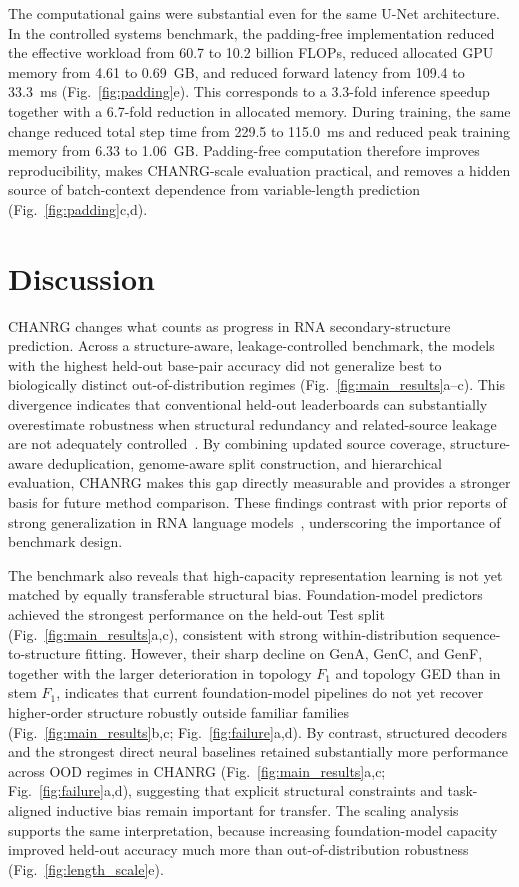 \documentclass[pdflatex,sn-mathphys-num]{sn-jnl}%
\theoremstyle{thmstyleone}%
\theoremstyle{thmstyletwo}%
\theoremstyle{thmstylethree}%
\begin{document}
The computational gains were substantial even for the same U-Net architecture.
In the controlled systems benchmark, the padding-free implementation reduced the effective workload from 60.7 to 10.2 billion FLOPs, reduced allocated GPU memory from 4.61 to 0.69~GB, and reduced forward latency from 109.4 to 33.3~ms (Fig.~\ref{fig:padding}e).
This corresponds to a 3.3-fold inference speedup together with a 6.7-fold reduction in allocated memory.
During training, the same change reduced total step time from 229.5 to 115.0~ms and reduced peak training memory from 6.33 to 1.06~GB.
Padding-free computation therefore improves reproducibility, makes CHANRG-scale evaluation practical, and removes a hidden source of batch-context dependence from variable-length prediction (Fig.~\ref{fig:padding}c,d).

\section{Discussion}\label{sec:discussion}

CHANRG changes what counts as progress in RNA secondary-structure prediction.
Across a structure-aware, leakage-controlled benchmark, the models with the highest held-out base-pair accuracy did not generalize best to biologically distinct out-of-distribution regimes (Fig.~\ref{fig:main_results}a--c).
This divergence indicates that conventional held-out leaderboards can substantially overestimate robustness when structural redundancy and related-source leakage are not adequately controlled~\cite{qiu2023sequence,lasher2025bprna}.
By combining updated source coverage, structure-aware deduplication, genome-aware split construction, and hierarchical evaluation, CHANRG makes this gap directly measurable and provides a stronger basis for future method comparison.
These findings contrast with prior reports of strong generalization in RNA language models~\cite{penic2025rinalmo}, underscoring the importance of benchmark design.

The benchmark also reveals that high-capacity representation learning is not yet matched by equally transferable structural bias.
Foundation-model predictors achieved the strongest performance on the held-out Test split (Fig.~\ref{fig:main_results}a,c), consistent with strong within-distribution sequence-to-structure fitting.
However, their sharp decline on GenA, GenC, and GenF, together with the larger deterioration in topology $F_1$ and topology GED than in stem $F_1$, indicates that current foundation-model pipelines do not yet recover higher-order structure robustly outside familiar families (Fig.~\ref{fig:main_results}b,c; Fig.~\ref{fig:failure}a,d).
By contrast, structured decoders and the strongest direct neural baselines retained substantially more performance across OOD regimes in CHANRG (Fig.~\ref{fig:main_results}a,c; Fig.~\ref{fig:failure}a,d), suggesting that explicit structural constraints and task-aligned inductive bias remain important for transfer.
The scaling analysis supports the same interpretation, because increasing foundation-model capacity improved held-out accuracy much more than out-of-distribution robustness (Fig.~\ref{fig:length_scale}e).
\end{document}
